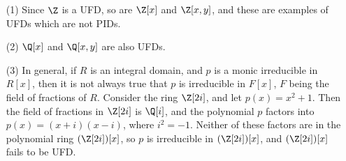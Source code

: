 \begin{example}\label{example_3.3}
    \begin{enumerate}
        \item[(1)] Since $\Z$ is a UFD, so are $\Z[x]$ and $\Z[x,y]$, and these
            are examples of UFDs which are not PIDs.

        \item[(2)] $\Q[x]$ and $\Q[x,y]$ are also UFDs.

        \item[(3)] In general, if $R$ is an integral domain, and  $p$ is a monic
            irreducible in  $R[x]$, then it is not always true that $p$ is
            irreducible in $F[x]$, $F$ being the field of fractions of  $R$.
            Consider the ring  $\Z[2i]$, and let $p(x)=x^2+1$. Then the field of
            fractions in $\Z[2i]$ is $\Q[i]$, and the polynomial $p$ factors
            into  $p(x)=(x+i)(x-i)$, where $i^2=-1$. Neither of these factors
            are in the polynomial ring  $(\Z[2i])[x]$, so $p$ is irreducible in
             $(\Z[2i])[x]$, and $(\Z[2i])[x]$ fails to be UFD.
    \end{enumerate}
\end{example}
